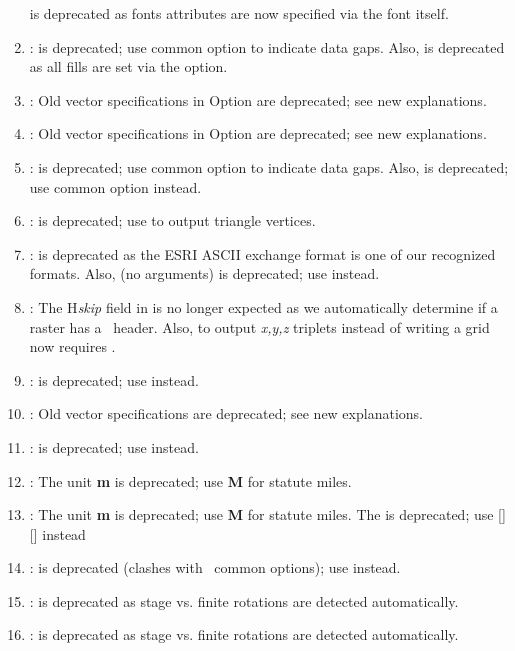 \begin{enumerate}
		 is deprecated as fonts attributes are now specified via the font itself.
	\item {}:  is deprecated; use common option  to indicate data gaps.  Also,
		 is deprecated as all fills are set via the  option.
	\item {}: Old vector specifications in Option  are deprecated; see new explanations.
	\item {}: Old vector specifications in Option  are deprecated; see new explanations.
	\item {}:  is deprecated; use common option  to indicate data gaps.  Also,
		 is deprecated; use common option  instead.
	\item {}:  is deprecated; use  to output triangle vertices.
	\item {}:  is deprecated as the ESRI ASCII exchange format is one of our recognized formats. Also,
		 (no arguments) is deprecated; use  instead.
	\item {}: The H{\it skip} field in  is no longer
		expected as we automatically determine if a raster has a \gmt\ header.  Also, to
		output {\it x,y,z} triplets instead of writing a grid now requires .
	\item {}:  is deprecated; use  instead.
	\item {}: Old vector specifications are deprecated; see new explanations.
	\item {}:  is deprecated; use  instead.
	\item {}: The unit {\bf m} is deprecated; use {\bf M} for statute miles.
	\item {}: The unit {\bf m} is deprecated; use {\bf M} for statute miles.
		The  is deprecated; use [][] instead
	\item {}:  is deprecated (clashes with \gmt\ common options); use  instead.
	\item {}:  is deprecated as stage vs. finite rotations are detected automatically.
	\item {}:  is deprecated as stage vs. finite rotations are detected automatically.

\end{enumerate}
